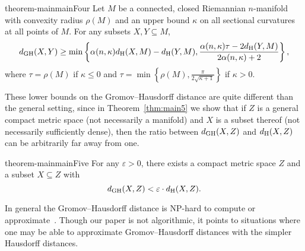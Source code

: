 \documentclass[11pt, reqno, english]{amsart}
\begin{document}
\vspace{3mm}
\begin{restatable}{theorem-main}{mainFour}
\label{thm:main4}
Let $M$ be a connected, closed Riemannian $n$-manifold with convexity radius $\rho(M)$ and an upper bound $\kappa$ on all sectional curvatures at all points of $M$. 
For any subsets $X,Y\subseteq M$,
\[d_{\mathrm{GH}}(X,Y) \geq \min\left\{\alpha(n,\kappa)d_{\mathrm{H}}(X,M)-d_{\mathrm{H}}(Y,M),\frac{\alpha(n,\kappa)\tau-2d_{\mathrm{H}}(Y,M)}{2\alpha(n,\kappa)+2}\right\},\]
where $\tau=\rho(M)$ if $\kappa\le 0$ and $\tau=\min\left\{\rho(M),\tfrac{\pi}{2\sqrt{\kappa+1}}\right\}$ if $\kappa>0$.
\end{restatable}
\vspace{3mm}

These lower bounds on the Gromov--Hausdorff distance are quite different than the general setting, since in Theorem~\ref{thm:main5} we show that if $Z$ is a general compact metric space (not necessarily a manifold) and $X$ is a subset thereof (not necessarily sufficiently dense), then the ratio between $d_{\mathrm{GH}}(X,Z)$ and $d_{\mathrm{H}}(X,Z)$ can be arbitrarily far away from one.

\vspace{3mm}
\begin{restatable}{theorem-main}{mainFive}
\label{thm:main5}    
For any $\varepsilon>0$, there exists a compact metric space $Z$ and a subset $X\subseteq Z$ with \[d_{\mathrm{GH}}(X,Z) < \varepsilon \cdot d_{\mathrm{H}}(X,Z).\]
\end{restatable}
\vspace{3mm}

In general the Gromov--Hausdorff distance is NP-hard to compute or approximate~\cite{agarwal_computing_2015,Schmiedl2017}.
Though our paper is not algorithmic, it points to situations where one may be able to approximate Gromov--Hausdorff distances with the simpler Hausdorff distances.
\end{document}
